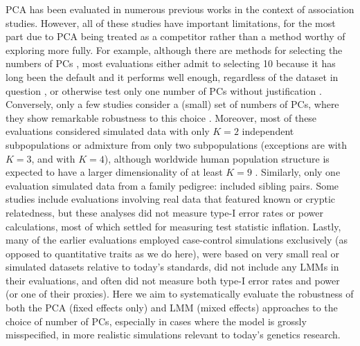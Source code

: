 \documentclass[11pt]{article}
\begin{document}
PCA has been evaluated in numerous previous works in the context of association studies.
However, all of these studies have important limitations, for the most part due to PCA being treated as a competitor rather than a method worthy of exploring more fully.
For example, although there are methods for selecting the numbers of PCs \citep{patterson_population_2006}, most evaluations either admit to selecting 10 because it has long been the default and it performs well enough, regardless of the dataset in question \citep{epstein_simple_2007, li_improved_2008, astle_population_2009, li_correcting_2010, wu_comparison_2011}, or otherwise test only one number of PCs without justification \citep{zhang_semiparametric_2003, kimmel_randomization_2007, zhao_arabidopsis_2007, zhang_comparison_2008, price_new_2010, bouaziz_accounting_2011, hoffman_correcting_2013, wang_analytical_2013, tucker_improving_2014, yang_advantages_2014, song_testing_2015, sul_population_2018}.
Conversely, only a few studies consider a (small) set of numbers of PCs, where they show remarkable robustness to this choice \citep{price_principal_2006, kang_variance_2010, wojcik_genetic_2019}.
Moreover, most of these evaluations considered simulated data with only $K = 2$ independent subpopulations or admixture from only two subpopulations (exceptions are \citet{astle_population_2009} with $K=3$, and \citet{wang_analytical_2013} with $K = 4$), although worldwide human population structure is expected to have a larger dimensionality of at least $K = 9$ \citep{wojcik_genetic_2019}.
Similarly, only one evaluation simulated data from a family pedigree: \citet{price_new_2010} included sibling pairs.
Some studies include evaluations involving real data that featured known or cryptic relatedness, but these analyses did not measure type-I error rates or power calculations, most of which settled for measuring test statistic inflation.
Lastly, many of the earlier evaluations employed case-control simulations exclusively (as opposed to quantitative traits as we do here), were based on very small real or simulated datasets relative to today's standards, did not include any LMMs in their evaluations, and often did not measure both type-I error rates and power (or one of their proxies).
Here we aim to systematically evaluate the robustness of both the PCA (fixed effects only) and LMM (mixed effects) approaches to the choice of number of PCs, especially in cases where the model is grossly misspecified, in more realistic simulations relevant to today's genetics research.
\end{document}

